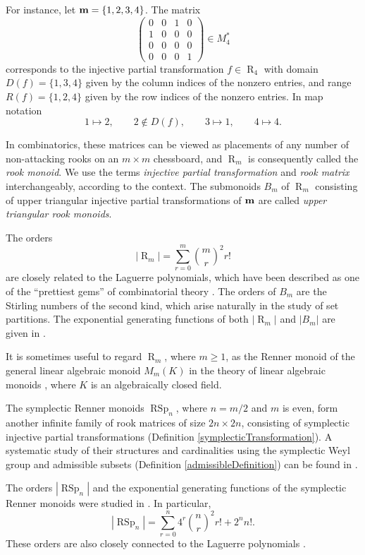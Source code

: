 \documentclass[11pt]{article}
\newcommand{\qq}{\qquad}
\newcommand{\ges}{\geqslant}
\DeclareMathOperator{\RSp}{RSp}
\DeclareMathOperator{\R}{R}
\begin{document}
For instance, let 
${\bf m}=\{1, 2, 3, 4\}$. The matrix
$$
                        \begin{pmatrix}
                        0&0&1&0\\
                        1&0&0&0\\
                        0&0&0&0\\
                        0&0&0&1
                        \end{pmatrix}\in M^*_4
$$
corresponds to the injective partial transformation $f\in \R_4$ with domain $D(f)=\{1, 3, 4\}$ given by the column indices of the nonzero entries, and range $R(f)=\{1, 2, 4\}$ given by the row indices of the nonzero entries. In map notation
\[
    1\mapsto 2,\qq 2\notin D(f),\qq 3\mapsto 1,\qq4\mapsto 4.
\]

In combinatorics, these matrices can be viewed as placements of any number of non-attacking rooks on an $m\times m$ chessboard, and $\R_m$ is consequently called the {\em rook monoid}. We use the terms {\em injective partial transformation} and {\em rook matrix} interchangeably, according to the context. The submonoids $B_m$ of $\R_m$ consisting of upper triangular injective partial transformations of ${\bf m}$ are called {\em upper triangular rook monoids}.

The orders $$|\R_m| = \sum_{r=0}^m {\binom mr}^2 r!$$
are closely related to the Laguerre polynomials, which have been described as one of the ``prettiest gems'' of combinatorial theory \cite{A, BRR}. The orders of $B_m$ are the Stirling numbers of the second kind, which arise naturally in the study of set partitions. The exponential generating functions of both $|\R_m|$ and $|B_m|$ are given in \cite{BRR}.

It is sometimes useful to regard $\R_m$, where $m\ges1$, as the Renner monoid of the general linear algebraic monoid $M_m(K)$ in the theory of linear algebraic monoids \cite{ZL, PU1, R1, SL1}, where $K$ is an algebraically closed field.

The symplectic Renner monoids $\RSp_n$, where $n=m/2$ and $m$ is even, form another infinite family of rook matrices of size $2n\times2n$, consisting of symplectic injective partial transformations (Definition \ref{symplecticTransformation}). A systematic study of their structures and cardinalities using the symplectic Weyl group and admissible subsets (Definition \ref{admissibleDefinition}) can be found in \cite{CLSW, ZHL}.

The orders $|\RSp_n|$ and the exponential generating functions of the symplectic Renner monoids were studied in \cite{LLC}. In particular,
$$
  |\RSp_n|   = \sum_{r=0}^n 4^r{\binom nr}^2 r! + 2^n n!.
$$
These orders are also closely connected to the Laguerre polynomials \cite{LLC}. 
\end{document}
